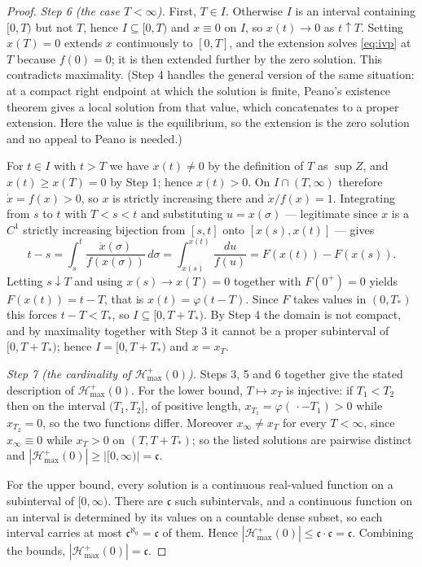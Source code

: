 \documentclass[12pt]{article}
\theoremstyle{plain}
\theoremstyle{definition}
\theoremstyle{remark}
\newcommand{\cont}{\mathfrak{c}}
\newcommand{\Hmax}{\mathcal{H}^{+}_{\max}}
\begin{document}
\begin{proof}
\smallskip
\emph{Step 6 (the case $T<\infty$).} First, $T\in I$. Otherwise $I$ is an
interval containing $[0,T)$ but not $T$, hence $I\subseteq[0,T)$ and $x\equiv0$
on $I$, so $x(t)\to0$ as $t\uparrow T$. Setting $x(T)=0$ extends $x$
continuously to $[0,T]$, and the extension solves \eqref{eq:ivp} at $T$ because
$f(0)=0$; it is then extended further by the zero solution. This contradicts
maximality. (Step 4 handles the general version of the same situation: at a
compact right endpoint at which the solution is finite, Peano's existence
theorem gives a local solution from that value, which concatenates to a proper
extension. Here the value is the equilibrium, so the extension is the zero
solution and no appeal to Peano is needed.)

For $t\in I$ with $t>T$ we have $x(t)\ne0$ by the definition of $T$ as
$\sup Z$, and $x(t)\ge x(T)=0$ by Step 1; hence $x(t)>0$. On $I\cap(T,\infty)$
therefore $\dot x=f(x)>0$, so $x$ is strictly increasing there and
$\dot x/f(x)=1$. Integrating from $s$ to $t$ with $T<s<t$ and substituting
$u=x(\sigma)$ --- legitimate since $x$ is a $C^{1}$ strictly increasing
bijection from $[s,t]$ onto $[x(s),x(t)]$ --- gives
\[
  t-s=\int_{s}^{t}\frac{\dot x(\sigma)}{f(x(\sigma))}\,d\sigma
     =\int_{x(s)}^{x(t)}\frac{du}{f(u)}
     =F(x(t))-F(x(s)).
\]
Letting $s\downarrow T$ and using $x(s)\to x(T)=0$ together with $F(0^{+})=0$
yields $F(x(t))=t-T$, that is $x(t)=\varphi(t-T)$. Since $F$ takes values in
$(0,T_{*})$ this forces $t-T<T_{*}$, so $I\subseteq[0,T+T_{*})$. By Step 4 the
domain is not compact, and by maximality together with Step 3 it cannot be a
proper subinterval of $[0,T+T_{*})$; hence $I=[0,T+T_{*})$ and $x=x_{T}$.

\smallskip
\emph{Step 7 (the cardinality of $\Hmax(0)$).} Steps 3, 5 and 6 together give
the stated description of $\Hmax(0)$. For the lower bound, $T\mapsto x_{T}$ is
injective: if $T_{1}<T_{2}$ then on the interval $(T_{1},T_{2}]$, of positive
length, $x_{T_{1}}=\varphi(\,\cdot-T_{1})>0$ while $x_{T_{2}}=0$, so the two
functions differ. Moreover $x_{\infty}\ne x_{T}$ for every $T<\infty$, since
$x_{\infty}\equiv0$ while $x_{T}>0$ on $(T,T+T_{*})$; so the listed solutions
are pairwise distinct and $|\Hmax(0)|\ge|[0,\infty)|=\cont$.

For the upper bound, every solution is a continuous real-valued function on a
subinterval of $[0,\infty)$. There are $\cont$ such subintervals, and a
continuous function on an interval is determined by its values on a countable
dense subset, so each interval carries at most $\cont^{\aleph_{0}}=\cont$ of
them. Hence $|\Hmax(0)|\le\cont\cdot\cont=\cont$. Combining the bounds,
$|\Hmax(0)|=\cont$.


\end{proof}
\end{document}
